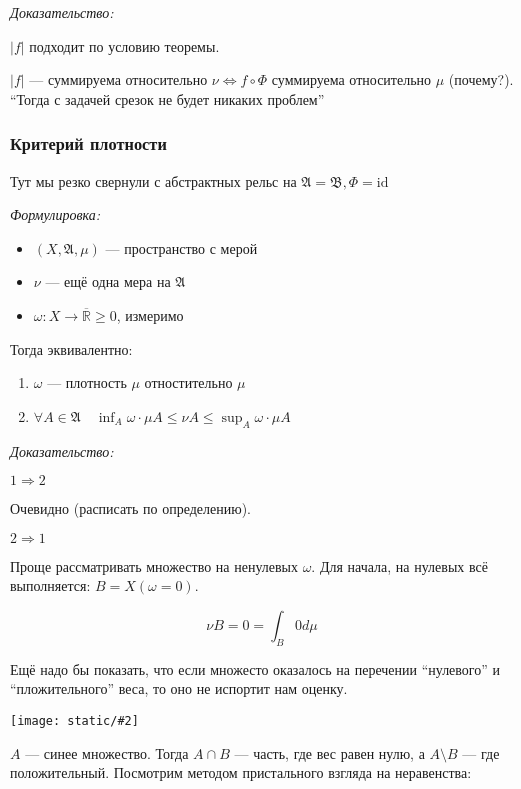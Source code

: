 \documentclass{article}
\def\images#1#2{\begin{center}\texttt{[image: static/\#2]}\end{center}}
\def\rinf{\overline{\mathbb{R}}}
\begin{document}
\textit{Доказательство:}

$|f|$ подходит по условию теоремы.

$|f|$ --- суммируема относительно $\nu \Leftrightarrow f \circ \Phi$ суммируема относительно $\mu$ (почему?). ``Тогда с задачей срезок не будет никаких проблем''

\subsubsection{Критерий плотности}

Тут мы резко свернули с абстрактных рельс на $\mathfrak{A} = \mathfrak{B}, \Phi = \text{id}$

\textit{Формулировка:}

\begin{itemize}
    \item $(X, \mathfrak{A}, \mu)$ --- пространство с мерой
    \item $\nu$ --- ещё одна мера на $\mathfrak{A}$
    \item $\omega: X \rightarrow \rinf \ge 0$, измеримо 
\end{itemize}

Тогда эквивалентно:

\begin{enumerate}
    \item $\omega$ --- плотность $\mu$ отностительно $\mu$
    \item $\forall A \in \mathfrak{A} \quad \inf_{A} \omega \cdot \mu A \le \nu A \le \sup_{A} \omega \cdot \mu A$
\end{enumerate}

\textit{Доказательство:}

\textbf{$1 \Rightarrow 2$}

Очевидно (расписать по определению).

\textbf{$2 \Rightarrow 1$}

Проще рассматривать множество на ненулевых $\omega$. Для начала, на нулевых всё выполняется: $B = X(\omega = 0)$.

\[\nu B = 0 = \int_{B} 0 d\mu\]

Ещё надо бы показать, что если множесто оказалось на перечении ``нулевого'' и ``пложительного'' веса, то оно не испортит нам оценку. 

\images{0.5}{kr_pl_1.jpg}

$A$ --- синее множество. Тогда $A \cap B$ --- часть, где вес равен нулю, а $A \setminus B$ --- где положительный. Посмотрим методом пристального взгляда на неравенства:
\end{document}
